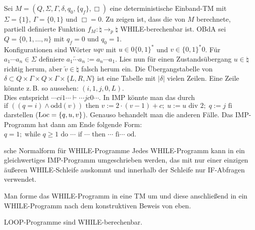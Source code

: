 \begin{Beweis}
    Sei $M = (Q, \Sigma, \Gamma, \delta, q_0, \{q_f\}, \Box)$ eine deterministische Einband-TM mit
    $\Sigma = \{1\}$, $\Gamma = \{0, 1\}$ und $\Box = 0$.
    Zu zeigen ist, dass die von $M$ berechnete, partiell definierte Funktion
    $f_M\colon \natural \rightarrow_p \natural$ WHILE-berechenbar ist.
    OBdA sei $Q = \{0, 1, \dotsc, n\}$ mit $q_f = 0$ und $q_0 = 1$.\\
    Konfigurationen sind Wörter $uqv$ mit $u \in 0\{0, 1\}^\ast$ und $v \in \{0, 1\}^\ast 0$.
    Für $a_1 \dotsb a_n \in \Sigma$ definiere
    $\overleftarrow{a_1 \dotsb a_n} := a_n \dotsb a_1$.
    Lies nun für einen Zustandsübergang $u \in \natural$ richtig herum, aber
    $\overleftarrow{v} \in \natural$ falsch herum ein.
    Die Übergangstabelle von
    $\delta \subset Q \times \Gamma \times Q \times \Gamma \times \{L, R, N\}$ ist eine Tabelle
    mit $|\delta|$ vielen Zeilen.
    Eine Zeile könnte z.\,B. so aussehen: $(i, 1, j, 0, L)$.\\
    Dies entspricht $\dotsb c i 1 \dotsb \vdash \dotsb j c 0 \dotsb$.
    In IMP könnte man das durch\\
    $\text{if } ((q = i) \land \text{odd}(v)) \text{ then } v := 2 \cdot (v - 1) + c;\;
    u := u \text{ div } 2;\; q := j \text{ fi}$ darstellen ($\text{Loc} = \{q, u, v\}$).
    Genauso behandelt man die anderen Fälle.
    Das IMP-Programm hat dann am Ende folgende Form:
    $q = 1;\; \text{while } q \ge 1 \text{ do } \dotsb
    \text{ if } \dotsb \text{ then } \dotsb \text{ fi} \dotsb \text{ od}$.
\end{Beweis}

\begin{Satz}{sche Normalform für WHILE-Programme}
    Jedes WHILE-Programm kann in ein gleichwertiges IMP-Programm umgeschrieben werden,
    das mit nur einer einzigen äußeren WHILE-Schleife auskommt und innerhalb der Schleife nur
    IF-Abfragen verwendet.
\end{Satz}

\begin{Beweis}
    Man forme das WHILE-Programm in eine TM um und diese anschließend in ein WHILE-Programm nach
    dem konstruktiven Beweis von eben.
\end{Beweis}

\linie

\begin{Bem}
    LOOP-Programme sind WHILE-berechenbar.
\end{Bem}

